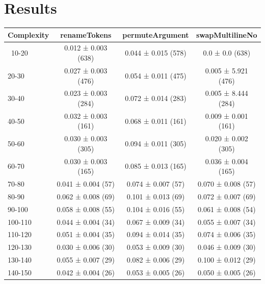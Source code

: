 \documentclass[sigconf,review,anonymous]{acmart}
\begin{document}
  \pagebreak\section{Results}\label{sec:results}
    {
    \begin{table}[H]
      \tiny
      \begin{tabular}{l|ccc}
        Complexity          & renameTokens        & permuteArgument     & swapMultilineNo     \\\hline\
        10-20               & 0.012 ± 0.003 (638) & 0.044 ± 0.015 (578) & 0.0 ± 0.0 (638)     \\
        20-30               & 0.027 ± 0.003 (476) & 0.054 ± 0.011 (475) & 0.005 ± 5.921 (476) \\
        30-40               & 0.023 ± 0.003 (284) & 0.072 ± 0.014 (283) & 0.005 ± 8.444 (284) \\
        40-50               & 0.032 ± 0.003 (161) & 0.068 ± 0.011 (161) & 0.009 ± 0.001 (161) \\
        50-60               & 0.030 ± 0.003 (305) & 0.094 ± 0.011 (305) & 0.020 ± 0.002 (305) \\
        60-70               & 0.030 ± 0.003 (165) & 0.085 ± 0.013 (165) & 0.036 ± 0.004 (165) \\
        70-80               & 0.041 ± 0.004 (57)  & 0.074 ± 0.007 (57)  & 0.070 ± 0.008 (57)  \\
        80-90               & 0.062 ± 0.008 (69)  & 0.101 ± 0.013 (69)  & 0.072 ± 0.007 (69)  \\
        90-100              & 0.058 ± 0.008 (55)  & 0.104 ± 0.016 (55)  & 0.061 ± 0.008 (54)  \\
        100-110             & 0.044 ± 0.004 (34)  & 0.067 ± 0.009 (34)  & 0.055 ± 0.007 (34)  \\
        110-120             & 0.051 ± 0.004 (35)  & 0.094 ± 0.014 (35)  & 0.074 ± 0.006 (35)  \\
        120-130             & 0.030 ± 0.006 (30)  & 0.053 ± 0.009 (30)  & 0.046 ± 0.009 (30)  \\
        130-140             & 0.055 ± 0.007 (29)  & 0.082 ± 0.006 (29)  & 0.100 ± 0.012 (29)  \\
        140-150             & 0.042 ± 0.004 (26)  & 0.053 ± 0.005 (26)  & 0.050 ± 0.005 (26)  \\
      \end{tabular}
    \end{table}

}
\end{document}
